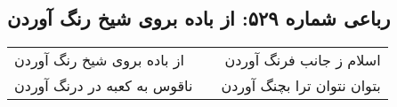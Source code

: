 \begin{center}
\section*{رباعی شماره ۵۲۹: از باده بروی شیخ رنگ آوردن}
\label{sec:sh529}
\begin{longtable}{l p{0.5cm} r}
از باده بروی شیخ رنگ آوردن
&&
اسلام ز جانب فرنگ آوردن
\\
ناقوس به کعبه در درنگ آوردن
&&
بتوان نتوان ترا بچنگ آوردن
\\
\end{longtable}
\end{center}
